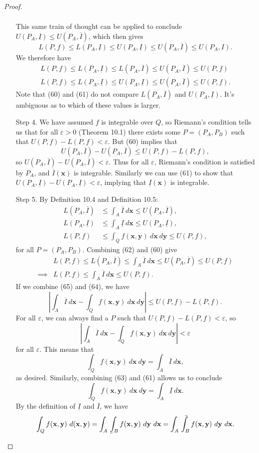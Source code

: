 \documentclass{article}
\def\upint{\mathchoice%
	{\mkern13mu\overline{\vphantom{\intop}\mkern7mu}\mkern-20mu}%
	{\mkern7mu\overline{\vphantom{\intop}\mkern7mu}\mkern-14mu}%
	{\mkern7mu\overline{\vphantom{\intop}\mkern7mu}\mkern-14mu}%
	{\mkern7mu\overline{\vphantom{\intop}\mkern7mu}\mkern-14mu}%
	\int}
\def\lowint{\mkern3mu\underline{\vphantom{\intop}\mkern7mu}\mkern-10mu\int}
\newcommand{\x}{\mathbf{x}}
\newcommand{\y}{\mathbf{y}}
\newcommand{\abs}[1]{\left\lvert#1\right\rvert}
\theoremstyle{definition}
\begin{document}
\begin{proof}
\begin{enumerate}
\begin{align*}
 		\end{align*}
 		This same train of thought can be applied to conclude $ U(P_A,\underline I) \le U(P_A, \overline I) $, which then gives 
 		$$ L(P,f) \le L(P_A,\underline I) \le U(P_A, \underline I) \le U(P_A ,\overline I)  \le U(P_A, I) .$$ We therefore have 
 		\begin{align}
 			 L(P,f) \le L(P_A,\underline I) \le L(P_A, \overline I) \le U(P_A ,\overline I)  \le U(P, f) \\ 
 			 L(P,f) \le L(P_A,\underline I) \le U(P_A, \underline I) \le U(P_A ,\overline I)  \le U(P, f).
 		\end{align}
 		Note that (60) and (61) do not compare $ L(P_A, \overline I) $ and $ U(P_A, \underline I) $. It's ambiguous as to which of these values is larger.
 		\item [Step 4.] We have assumed $ f $ is integrable over $ Q $, so Riemann's condition tells us that for all $ \varepsilon >0 $ (Theorem 10.1) there exists some $ P=(P_A,P_B) $ such that $ U(P,f)-L(P,f)<\varepsilon $. But (60) implies that 
 		$$ U(P_A, \overline{I}) - U(P_A, \overline{I})  \le U(P,f)-L(P,f), $$ so $ U(P_A, \overline{I}) - U(P_A, \overline{I}) <\varepsilon$. Thus for all $ \varepsilon $, Riemann's condition is satisfied by $ P_A $, and $ \overline{I}(\x) $ is integrable. Similarly we can use (61) to show that $ U(P_A, \underline{I}) - U(P_A, \underline{I}) <\varepsilon$, implying that $ \underline I(\x) $ is integrable.
 		\item [Step 5.] By Definition 10.4 and Definition 10.5:
		\begin{align}
			L(P_A, \overline I) &\le \int_A \overline{I}\ d\x \le U(P_A, \overline I),\\ 
			L(P_A, \underline I) &\le \int_A \underline{I}\ d\x \le U(P_A, \underline I),\\
			L(P, f) &\le \int_Q f(\x,\y)\ d\x \ d\y \le U(P, f),
		\end{align}
	for all $ P=(P_A,P_B) $. Combining (62) and (60) give 
	\begin{align}
		&L(P,f)\le L(P_A, \overline I)\le \int_A \overline{I}\ d\x \le U(P_A, \overline I) \le U(P,f) \nonumber \\
		\implies & L(P, f) \le  \int_A \overline{I}\ d\x \le U(P, f).
	\end{align}
	If we combine (65) and (64), we have 
	$$ \abs{ \int_A \overline{I}\ d\x -  \int_Q f(\x,\y)\ d\x \ d\y}\le U(P,f)-L(P,f).$$ For all $ \varepsilon $, we can always find a $ P $ such that  $ U(P,f)-L(P,f) < \varepsilon $, so 
	$$ \abs{ \int_A \overline{I}\ d\x -  \int_Q f(\x,\y)\ d\x \ d\y} < \varepsilon $$ for all $ \varepsilon $. This means that 
	$$\int_Q f(\x,\y)\ d\x \ d\y =  \int_A \overline{I}\ d\x,$$ as desired. Similarly, combining (63) and (61) allows us to conclude 
	$$\int_Q f(\x,\y)\ d\x \ d\y =  \int_A \underline{I}\ d\x.$$ By the definition of $ \underline I $ and $ \overline I $, we have 
	$$	\int_Q f(\x,\y)\ d(\x,\y) = \int_{A}\lowint_Bf(\x,\y)\ d\y\ d\x = \int_{A}\upint_Bf(\x,\y)\ d\y\ d\x.$$
 	\end{enumerate}
 \end{proof}
\end{document}
